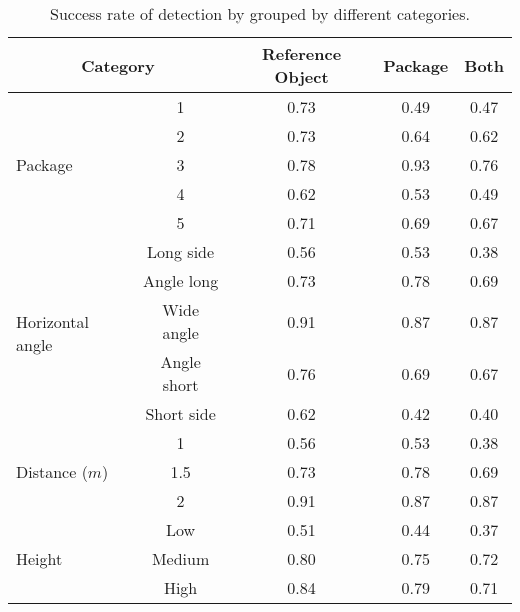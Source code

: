 \begin{table}[H]
\centering
\begin{tabular}{lcccc}
\toprule
\multicolumn{2}{c}{Category} & Reference Object & Package & Both\\
\midrule

\multirow{5}{*}{Package} 
& 1 & 0.73 & 0.49 & 0.47 \\ 
& 2 & 0.73 & 0.64 & 0.62 \\
& 3 & 0.78 & 0.93 & 0.76 \\
& 4 & 0.62 & 0.53 & 0.49 \\
& 5 & 0.71 & 0.69 & 0.67 \\
\midrule

\multirow{5}{1.5cm}{Horizontal angle}
& Long side		& 0.56 & 0.53 & 0.38 \\ 
& Angle long		& 0.73 & 0.78 & 0.69 \\
& Wide angle 		& 0.91 & 0.87 & 0.87 \\
& Angle short 	& 0.76 & 0.69 & 0.67 \\
& Short side		& 0.62 & 0.42 & 0.40 \\
\midrule
\multirow{3}{*}{Distance ($m$)} 
& 1 			& 0.56 & 0.53 & 0.38 \\ 
& 1.5  			& 0.73 & 0.78 & 0.69 \\
& 2 			& 0.91 & 0.87 &0.87 \\
\midrule
\multirow{3}{*}{Height} 
& Low 		& 0.51 & 0.44 & 0.37 \\ 
& Medium 	& 0.80 & 0.75 & 0.72 \\
& High		& 0.84 & 0.79 & 0.71 \\
\bottomrule
 \end{tabular}
 \caption{Success rate of detection by grouped by different categories.}
\label{table:detection_categories}
\end{table}

